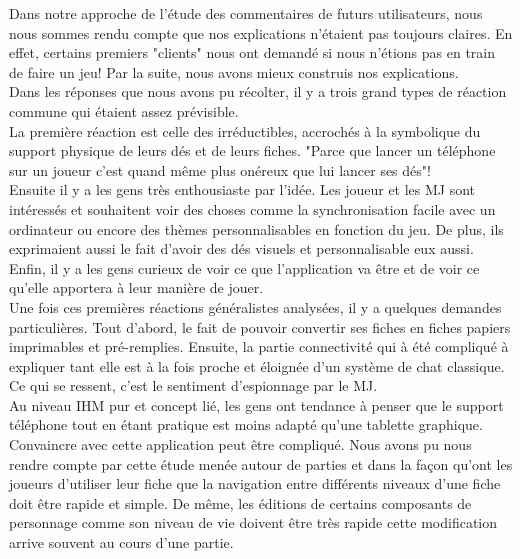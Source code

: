\documentclass[11pt,a4paper]{article}
\begin{document}
Dans notre approche de l'étude des commentaires de futurs utilisateurs, nous
nous sommes rendu compte que nos explications n'étaient pas toujours
claires. En effet, certains premiers "clients" nous ont demandé si nous n'étions
pas en train de faire un jeu! Par la suite, nous avons mieux construis nos
explications.\\

Dans les réponses que nous avons pu récolter, il y a trois grand types de
réaction commune qui étaient assez prévisible.\\


La première réaction est celle des irréductibles, accrochés à la symbolique du
support physique de leurs dés et de leurs fiches. "Parce que lancer un
téléphone sur un joueur c'est quand même plus onéreux que lui lancer ses dés"!\\

Ensuite il y a les gens très enthousiaste par l'idée. Les joueur et les MJ sont
intéressés et souhaitent voir des choses comme la synchronisation facile avec
un ordinateur ou encore des thèmes personnalisables en fonction du jeu. De
plus, ils exprimaient aussi le fait d'avoir des dés visuels et personnalisable
eux aussi.\\

Enfin, il y a les gens curieux de voir ce que l'application va être et de
voir ce qu'elle apportera à leur manière de jouer.\\

Une fois ces premières réactions généralistes analysées, il y a quelques
demandes particulières. Tout d'abord, le fait de pouvoir convertir ses fiches en
fiches papiers imprimables et pré-remplies. Ensuite, la partie connectivité qui
à été compliqué à expliquer tant elle est à la fois proche et éloignée d'un
système de chat classique. Ce qui se ressent, c'est le sentiment d'espionnage
par le MJ.\\

Au niveau IHM pur et concept lié, les gens ont tendance à penser que le support
téléphone tout en étant pratique est moins adapté qu'une tablette graphique.
Convaincre avec cette application peut être compliqué. Nous avons pu nous rendre
compte par cette étude menée autour de parties et dans la façon qu'ont les
joueurs d'utiliser leur fiche que la navigation entre différents niveaux d'une
fiche doit être rapide et simple. De même, les éditions de certains composants
de personnage comme son niveau de vie doivent être très rapide cette
modification arrive souvent au cours d'une partie.\\
\end{document}
